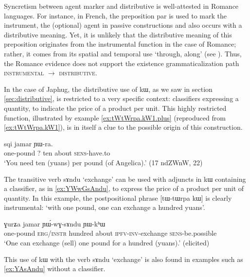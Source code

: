 \documentclass[oldfontcommands,oneside,a4paper,11pt]{article}
\newcommand{\ipa}[1]{{\phon #1}} %
\begin{document}
Syncretism between agent marker and distributive is well-attested in Romance languages. For instance, in French, the preposition  \ipa{par}  is used to mark the instrument, the (optional) agent in passive constructions and also occurs with a distributive meaning. Yet, it is unlikely that the distributive meaning of this preposition originates from the instrumental function in the case of Romance; rather, it comes from its  spatial and temporal use `through, along' (see \citealt[213]{wartburg58few8}). 
Thus, the Romance evidence does not support the existence grammaticalization path \textsc{instrumental} $\rightarrow$ \textsc{distributive}.

In the case of Japhug, the distributive use of \ipa{kɯ}, as we saw in section \ref{sec:distributive}, is restricted to a very specific context: classifiers expressing a quantity, to indicate the price of a product per unit. This highly restricted function, illustrated by example \ref{ex:tWtWrpa.kW1.plus} (reproduced from \ref{ex:tWtWrpa.kW1}), is in itself a clue to the possible origin of this construction.


 \begin{exe} 
\ex \label{ex:tWtWrpa.kW1.plus}
\gll  
[\ipa{tɯ-tɯrpa}] 	\ipa{\textbf{kɯ}} 	\ipa{sqi} 	\ipa{jamar} 	\ipa{ɲɯ-ra.} 	\\
one-pound ?{ } ten about \textsc{sens}-have.to \\
\glt `You need ten (yuans) per pound (of Angelica).' (17 ndZWnW, 22)
\end{exe}  

The transitive verb \ipa{sɤndu} `exchange' can be used with adjuncts in \ipa{kɯ} containing a classifier, as in \ref{ex:YWwGsAndu}, to express the price of a product per unit of quantity. In this example, the postpositional phrase [\ipa{tɯ-tɯrpa} 	\ipa{kɯ}] is clearly instrumental: `with one pound, one can exchange a hundred yuans'.

  \begin{exe}
\ex \label{ex:YWwGsAndu}
\gll 
[\ipa{tɯ-tɯrpa}]  	\ipa{kɯ}  	\ipa{ɣurʑa}  	\ipa{jamar}  	\ipa{ɲɯ́-wɣ-sɤndu}  	\ipa{ɲɯ-kʰɯ}  \\
one-pound \textsc{erg/instr} hundred about \textsc{ipfv-inv}-exchange \textsc{sens}-be.possible \\
\glt `One can exchange (sell) one pound for a hundred (yuans).' (elicited)
\end{exe}

This use of \ipa{kɯ} with the verb \ipa{sɤndu} `exchange' is also found in examples such as \ref{ex:YAsAndu} without a classifier.
\end{document}
